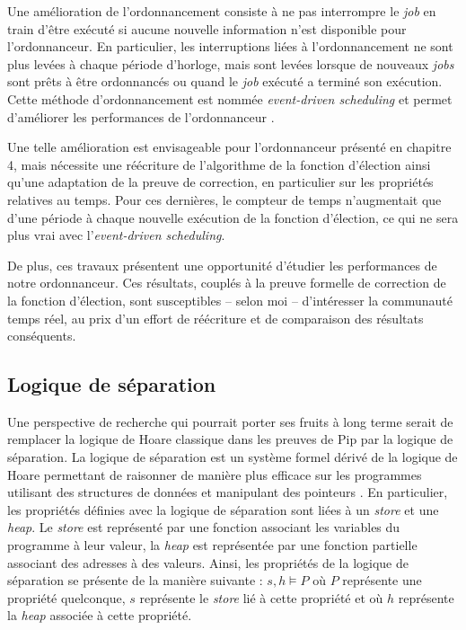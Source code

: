 		Une amélioration de l'ordonnancement consiste à ne pas interrompre le \emph{job} en train d'être exécuté si aucune nouvelle information n'est disponible pour l'ordonnanceur. En particulier, les interruptions liées à l'ordonnancement ne sont plus levées à chaque période d'horloge, mais sont levées lorsque de nouveaux \emph{jobs} sont prêts à être ordonnancés ou quand le \emph{job} exécuté a terminé son exécution. Cette méthode d'ordonnancement est nommée \emph{event-driven scheduling} et permet d'améliorer les performances de l'ordonnanceur \cite{brandenburg2009implementation}.

		Une telle amélioration est envisageable pour l'ordonnanceur présenté en chapitre 4, mais nécessite une réécriture de l'algorithme de la fonction d'élection ainsi qu'une adaptation de la preuve de correction, en particulier sur les propriétés relatives au temps. Pour ces dernières, le compteur de temps n'augmentait que d'une période à chaque nouvelle exécution de la fonction d'élection, ce qui ne sera plus vrai avec l'\emph{event-driven scheduling}.

		De plus, ces travaux présentent une opportunité d'étudier les performances de notre ordonnanceur. Ces résultats, couplés à la preuve formelle de correction de la fonction d'élection, sont susceptibles -- selon moi -- d'intéresser la communauté temps réel, au prix d'un effort de réécriture et de comparaison des résultats conséquents.

		\subsection{Logique de séparation}

		Une perspective de recherche qui pourrait porter ses fruits à long terme serait de remplacer la logique de Hoare classique dans les preuves de Pip par la logique de séparation. La logique de séparation est un système formel dérivé de la logique de Hoare permettant de raisonner de manière plus efficace sur les programmes utilisant des structures de données et manipulant des pointeurs \cite{separationlogic, seplogic}.
		En particulier, les propriétés définies avec la logique de séparation sont liées à un \emph{store} et une \emph{heap}. Le \emph{store} est représenté par une fonction associant les variables du programme à leur valeur, la \emph{heap} est représentée par une fonction partielle associant des adresses à des valeurs. Ainsi, les propriétés de la logique de séparation se présente de la manière suivante : $s, h \vDash P$ où $P$ représente une propriété quelconque, $s$ représente le \emph{store} lié à cette propriété et où $h$ représente la \emph{heap} associée à cette propriété.

